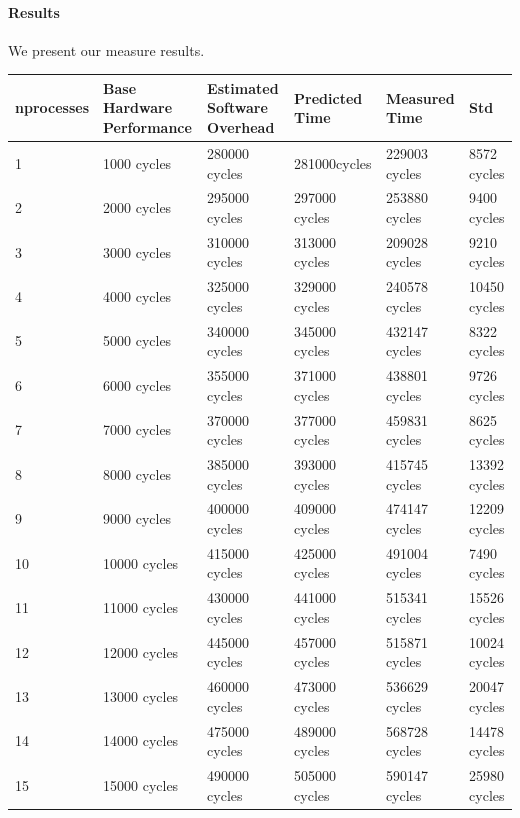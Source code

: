 \paragraph{Results}
We present our measure results.

\begin{center}
\begin{tabular}{| p{2cm} | p{2.5cm} | p{2.5cm} | p{2.5cm} | p{2.5cm} |  p{3cm}}
nprocesses   & Base Hardware Performance  & Estimated Software Overhead  & Predicted Time  & Measured Time  & Std \\
\hline
1 & 1000 cycles& 280000 cycles& 281000cycles & 229003 cycles & 8572 cycles \\
2 & 2000 cycles& 295000 cycles& 297000 cycles& 253880 cycles & 9400 cycles \\
3 & 3000 cycles& 310000 cycles& 313000 cycles& 209028 cycles & 9210 cycles \\
4 & 4000 cycles& 325000 cycles& 329000 cycles& 240578 cycles & 10450 cycles \\
5 & 5000 cycles& 340000 cycles& 345000 cycles& 432147 cycles & 8322 cycles \\
6 & 6000 cycles& 355000 cycles& 371000 cycles& 438801 cycles & 9726 cycles \\
7 & 7000 cycles& 370000 cycles& 377000 cycles& 459831 cycles & 8625 cycles \\
8 & 8000 cycles& 385000 cycles& 393000 cycles& 415745 cycles & 13392 cycles \\
9 & 9000 cycles& 400000 cycles& 409000 cycles& 474147 cycles & 12209 cycles \\
10 & 10000 cycles& 415000 cycles& 425000 cycles& 491004 cycles & 7490 cycles \\
11 & 11000 cycles& 430000 cycles& 441000 cycles& 515341 cycles & 15526 cycles \\
12 & 12000 cycles& 445000 cycles& 457000 cycles& 515871 cycles & 10024 cycles\\
13 & 13000 cycles& 460000 cycles& 473000 cycles& 536629 cycles & 20047 cycles \\
14 & 14000 cycles& 475000 cycles& 489000 cycles& 568728 cycles & 14478 cycles \\
15 & 15000 cycles& 490000 cycles& 505000 cycles& 590147 cycles & 25980 cycles \\

\end{tabular}
\end{center}

